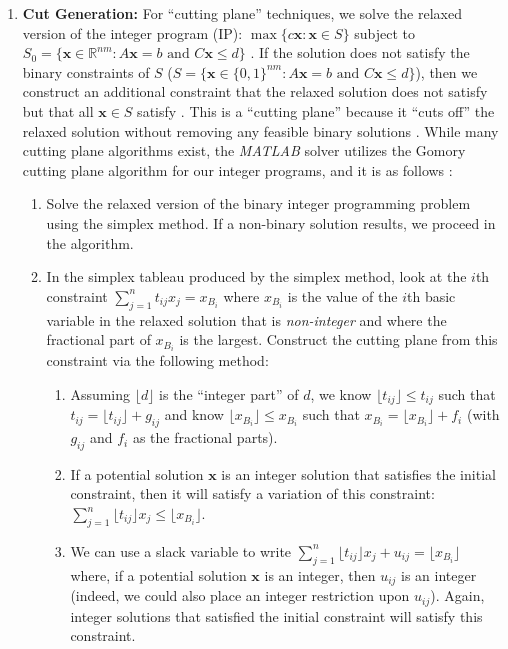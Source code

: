 \documentclass[11pt]{article}
\begin{document}
\begin{enumerate}
\item \textbf{Cut Generation:} For ``cutting plane'' techniques, we solve the relaxed version of the integer program (IP): $\max \{ c \textbf{x}: \textbf{x} \in S\}$ subject to $S_{0} = \{ \textbf{x} \in \mathbb{R}^{nm}: A \textbf{x} = b \text{ and } C \textbf{x} \leq d \}$ \cite{IP_textbook}.  If the solution does not satisfy the binary constraints of $S$ ($S = \{ \textbf{x} \in \{0,1\}^{nm}: A \textbf{x} = b \text{ and } C \textbf{x} \leq d \}$), then we construct an additional constraint that the relaxed solution does not satisfy but that all $\textbf{x} \in S$ satisfy \cite{IP_textbook}.  This is a ``cutting plane'' because it ``cuts off'' the relaxed solution without removing any feasible binary solutions \cite{IP_textbook}. While many cutting plane algorithms exist, the \textit{MATLAB} solver utilizes the Gomory cutting plane algorithm for our integer programs, and it is as follows \cite{Gomory_bk}: 

\begin{enumerate}
\item Solve the relaxed version of the binary integer programming problem using the simplex method.  If a non-binary solution results, we proceed in the algorithm.

\item In the simplex tableau produced by the simplex method, look at the $i$th constraint $\sum_{j=1}^{n} t_{ij} x_{j} = x_{B_{i}}$ where $x_{B_{i}}$ is the value of the $i$th basic variable in the relaxed solution that is \textit{non-integer} and where the fractional part of $x_{B_{i}}$ is the largest.  Construct the cutting plane from this constraint via the following method:

	\begin{enumerate}
    \item Assuming $\lfloor d \rfloor$ is the ``integer part'' of $d$, we know $\lfloor t_{ij} \rfloor \leq t_{ij}$ such that $t_{ij} = \lfloor t_{ij} \rfloor + g_{ij}$ and know $\lfloor x_{B_{i}} \rfloor \leq x_{B_{i}}$ such that $x_{B_{i}} = \lfloor x_{B_{i}} \rfloor + f_{i}$ (with $g_{ij}$ and $f_{i}$ as the fractional parts).
    
    \item If a potential solution $\textbf{x}$ is an integer solution that satisfies the initial constraint, then it will satisfy a variation of this constraint: $\sum_{j=1}^{n} \lfloor t_{ij} \rfloor x_{j} \leq \lfloor x_{B_{i}} \rfloor$.
    
    \item We can use a slack variable to write $\sum_{j=1}^{n} \lfloor t_{ij} \rfloor x_{j} + u_{ij} = \lfloor x_{B_{i}} \rfloor$ where, if a potential solution $\textbf{x}$ is an integer, then $u_{ij}$ is an integer (indeed, we could also place an integer restriction upon $u_{ij}$).  Again, integer solutions that satisfied the initial constraint will satisfy this constraint.    
    

\end{enumerate}
\end{enumerate}
\end{enumerate}
\end{document}
